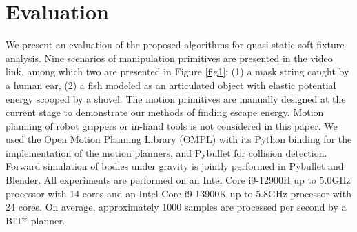 \documentclass[conference]{IEEEtran}
\begin{document}
\section{Evaluation}
We present an evaluation of the proposed algorithms for quasi-static soft fixture analysis. Nine scenarios of manipulation primitives are presented in the video link, among which two are presented in Figure \ref{fig1}: (1) a mask string caught by a human ear, (2) a fish modeled as an articulated object with elastic potential energy scooped by a shovel. 
The motion primitives are manually designed at the current stage to demonstrate our methods of finding escape energy. Motion planning of robot grippers or in-hand tools is not considered in this paper.
We used the Open Motion Planning Library (OMPL) \cite{o1} with its Python binding for the implementation of the motion planners, and Pybullet \cite{o2} for collision detection. Forward simulation of bodies under gravity is jointly performed in Pybullet and Blender.
All experiments are performed on an Intel Core i9-12900H up to 5.0GHz processor with 14 cores and an Intel Core i9-13900K up to 5.8GHz processor with 24 cores. 
On average, approximately 1000 samples are processed per second by a BIT* planner.



\end{document}
